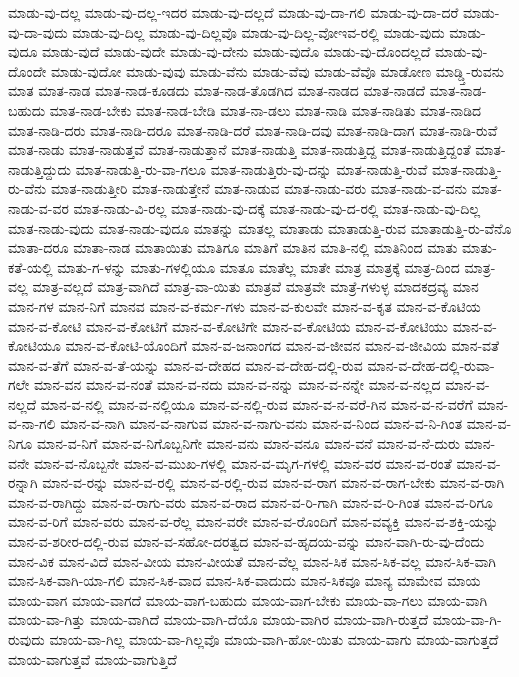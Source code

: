 {ಮಾಡು-ವು-ದಲ್ಲ
ಮಾಡು-ವು-ದಲ್ಲ-ಇದರ
ಮಾಡು-ವು-ದಲ್ಲದೆ
ಮಾಡು-ವು-ದಾ-ಗಲಿ
ಮಾಡು-ವು-ದಾ-ದರೆ
ಮಾಡು-ವು-ದಾ-ವುದು
ಮಾಡು-ವು-ದಿಲ್ಲ
ಮಾಡು-ವು-ದಿಲ್ಲವೊ
ಮಾಡು-ವು-ದಿಲ್ಲ-ವೋಇವ-ರಲ್ಲಿ
ಮಾಡು-ವುದು
ಮಾಡು-ವುದೂ
ಮಾಡು-ವುದೆ
ಮಾಡು-ವುದೇ
ಮಾಡು-ವು-ದೇನು
ಮಾಡು-ವುದೊ
ಮಾಡು-ವು-ದೊಂದಲ್ಲದೆ
ಮಾಡು-ವು-ದೊಂದೇ
ಮಾಡು-ವುದೋ
ಮಾಡು-ವುವು
ಮಾಡು-ವೆನು
ಮಾಡು-ವೆವು
ಮಾಡು-ವೆವೊ
ಮಾಡೋಣ
ಮಾಡ್ಡ್ತಿ-ರುವನು
ಮಾತ
ಮಾತ-ನಾಡ
ಮಾತ-ನಾಡ-ಕೂಡದು
ಮಾತ-ನಾಡ-ತೊಡಗಿದ
ಮಾತ-ನಾಡದ
ಮಾತ-ನಾಡದೆ
ಮಾತ-ನಾಡ-ಬಹುದು
ಮಾತ-ನಾಡ-ಬೇಕು
ಮಾತ-ನಾಡ-ಬೇಡಿ
ಮಾತ-ನಾ-ಡಲು
ಮಾತ-ನಾಡಿ
ಮಾತ-ನಾಡಿತು
ಮಾತ-ನಾಡಿದ
ಮಾತ-ನಾಡಿ-ದರು
ಮಾತ-ನಾಡಿ-ದರೂ
ಮಾತ-ನಾಡಿ-ದರೆ
ಮಾತ-ನಾಡಿ-ದವು
ಮಾತ-ನಾಡಿ-ದಾಗ
ಮಾತ-ನಾಡಿ-ರುವೆ
ಮಾತ-ನಾಡು
ಮಾತ-ನಾಡುತ್ತವೆ
ಮಾತ-ನಾಡುತ್ತಾನೆ
ಮಾತ-ನಾಡುತ್ತಿ
ಮಾತ-ನಾಡುತ್ತಿದ್ದ
ಮಾತ-ನಾಡುತ್ತಿದ್ದಂತೆ
ಮಾತ-ನಾಡುತ್ತಿದ್ದುದು
ಮಾತ-ನಾಡುತ್ತಿ-ರು-ವಾ-ಗಲೂ
ಮಾತ-ನಾಡುತ್ತಿರು-ವು-ದನ್ನು
ಮಾತ-ನಾಡುತ್ತಿ-ರುವೆ
ಮಾತ-ನಾಡುತ್ತಿ-ರು-ವೆನು
ಮಾತ-ನಾಡುತ್ತೀರಿ
ಮಾತ-ನಾಡುತ್ತೇನೆ
ಮಾತ-ನಾಡುವ
ಮಾತ-ನಾಡು-ವರು
ಮಾತ-ನಾಡು-ವ-ವನು
ಮಾತ-ನಾಡು-ವ-ವರ
ಮಾತ-ನಾಡು-ವಿ-ರಲ್ಲ
ಮಾತ-ನಾಡು-ವು-ದಕ್ಕೆ
ಮಾತ-ನಾಡು-ವು-ದ-ರಲ್ಲಿ
ಮಾತ-ನಾಡು-ವು-ದಿಲ್ಲ
ಮಾತ-ನಾಡು-ವುದು
ಮಾತ-ನಾಡು-ವುದೂ
ಮಾತನ್ನು
ಮಾತಲ್ಲ
ಮಾತಾಡು
ಮಾತಾಡುತ್ತಿ-ರುವ
ಮಾತಾಡುತ್ತಿ-ರು-ವೆನೊ
ಮಾತಾ-ದರೂ
ಮಾತಾ-ನಾಡ
ಮಾತಾಯಿತು
ಮಾತಿಗೂ
ಮಾತಿಗೆ
ಮಾತಿನ
ಮಾತಿ-ನಲ್ಲಿ
ಮಾತಿನಿಂದ
ಮಾತು
ಮಾತು-ಕತೆ-ಯಲ್ಲಿ
ಮಾತು-ಗ-ಳನ್ನು
ಮಾತು-ಗಳಲ್ಲಿಯೂ
ಮಾತೂ
ಮಾತೆಲ್ಲ
ಮಾತೇ
ಮಾತ್ರ
ಮಾತ್ರಕ್ಕೆ
ಮಾತ್ರ-ದಿಂದ
ಮಾತ್ರ-ವಲ್ಲ
ಮಾತ್ರ-ವಲ್ಲದೆ
ಮಾತ್ರ-ವಾಗಿದೆ
ಮಾತ್ರ-ವಾ-ಯಿತು
ಮಾತ್ರವೆ
ಮಾತ್ರವೇ
ಮಾತ್ರೆ-ಗಳುಳ್ಳ
ಮಾದಕದ್ರವ್ಯ
ಮಾನ
ಮಾನ-ಗಳ
ಮಾನ-ನಿಗೆ
ಮಾನವ
ಮಾನ-ವ-ಕರ್ಮ-ಗಳು
ಮಾನ-ವ-ಕುಲವೇ
ಮಾನ-ವ-ಕೃತ
ಮಾನ-ವ-ಕೊಟಿಯ
ಮಾನ-ವ-ಕೋಟಿ
ಮಾನ-ವ-ಕೋಟಿಗೆ
ಮಾನ-ವ-ಕೋಟಿಗೇ
ಮಾನ-ವ-ಕೋಟಿಯ
ಮಾನ-ವ-ಕೋಟಿಯು
ಮಾನ-ವ-ಕೋಟಿಯೂ
ಮಾನ-ವ-ಕೋಟಿ-ಯೊಂದಿಗೆ
ಮಾನ-ವ-ಜನಾಂಗದ
ಮಾನ-ವ-ಜೀವನ
ಮಾನ-ವ-ಜೀವಿಯ
ಮಾನ-ವತೆ
ಮಾನ-ವ-ತೆಗೆ
ಮಾನ-ವ-ತೆ-ಯನ್ನು
ಮಾನ-ವ-ದೇಹದ
ಮಾನ-ವ-ದೇಹ-ದಲ್ಲಿ-ರುವ
ಮಾನ-ವ-ದೇಹ-ದಲ್ಲಿ-ರುವಾ-ಗಲೇ
ಮಾನ-ವನ
ಮಾನ-ವ-ನಂತೆ
ಮಾನ-ವ-ನದು
ಮಾನ-ವ-ನನ್ನು
ಮಾನ-ವ-ನನ್ನೇ
ಮಾನ-ವ-ನಲ್ಲದ
ಮಾನ-ವ-ನಲ್ಲದೆ
ಮಾನ-ವ-ನಲ್ಲಿ
ಮಾನ-ವ-ನಲ್ಲಿಯೂ
ಮಾನ-ವ-ನಲ್ಲಿ-ರುವ
ಮಾನ-ವ-ನ-ವರೆ-ಗಿನ
ಮಾನ-ವ-ನ-ವರೆಗೆ
ಮಾನ-ವ-ನಾ-ಗಲಿ
ಮಾನ-ವ-ನಾಗಿ
ಮಾನ-ವ-ನಾಗುವ
ಮಾನ-ವ-ನಾಗು-ವನು
ಮಾನ-ವ-ನಿಂದ
ಮಾನ-ವ-ನಿ-ಗಿಂತ
ಮಾನ-ವ-ನಿಗೂ
ಮಾನ-ವ-ನಿಗೆ
ಮಾನ-ವ-ನಿಗೊಬ್ಬನಿಗೇ
ಮಾನ-ವನು
ಮಾನ-ವನೂ
ಮಾನ-ವನೆ
ಮಾನ-ವ-ನೆ-ದುರು
ಮಾನ-ವನೇ
ಮಾನ-ವ-ನೊಬ್ಬನೇ
ಮಾನ-ವ-ಮುಖ-ಗಳಲ್ಲಿ
ಮಾನ-ವ-ಮೃಗ-ಗಳಲ್ಲಿ
ಮಾನ-ವರ
ಮಾನ-ವ-ರಂತೆ
ಮಾನ-ವ-ರನ್ನಾಗಿ
ಮಾನ-ವ-ರನ್ನು
ಮಾನ-ವ-ರಲ್ಲಿ
ಮಾನ-ವ-ರಲ್ಲಿ-ರುವ
ಮಾನ-ವ-ರಾಗ
ಮಾನ-ವ-ರಾಗ-ಬೇಕು
ಮಾನ-ವ-ರಾಗಿ
ಮಾನ-ವ-ರಾಗಿದ್ದು
ಮಾನ-ವ-ರಾಗು-ವರು
ಮಾನ-ವ-ರಾದ
ಮಾನ-ವ-ರಿ-ಗಾಗಿ
ಮಾನ-ವ-ರಿ-ಗಿಂತ
ಮಾನ-ವ-ರಿಗೂ
ಮಾನ-ವ-ರಿಗೆ
ಮಾನ-ವರು
ಮಾನ-ವ-ರೆಲ್ಲ
ಮಾನ-ವರೇ
ಮಾನ-ವ-ರೊಂದಿಗೆ
ಮಾನ-ವವ್ಯಕ್ತಿ
ಮಾನ-ವ-ಶಕ್ತಿ-ಯನ್ನು
ಮಾನ-ವ-ಶರೀರ-ದಲ್ಲಿ-ರುವ
ಮಾನ-ವ-ಸಹೋ-ದರತ್ವದ
ಮಾನ-ವ-ಹೃದಯ-ವನ್ನು
ಮಾನ-ವಾಗಿ-ರು-ವು-ದೆಂದು
ಮಾನ-ವಿಕ
ಮಾನ-ವಿದೆ
ಮಾನ-ವೀಯ
ಮಾನ-ವೀಯತೆ
ಮಾನ-ವೆಲ್ಲ
ಮಾನ-ಸಿಕ
ಮಾನ-ಸಿಕ-ವಲ್ಲ
ಮಾನ-ಸಿಕ-ವಾಗಿ
ಮಾನ-ಸಿಕ-ವಾಗಿ-ಯಾ-ಗಲಿ
ಮಾನ-ಸಿಕ-ವಾದ
ಮಾನ-ಸಿಕ-ವಾದುದು
ಮಾನ-ಸಿಕವೂ
ಮಾನ್ಯ
ಮಾಮೇವ
ಮಾಯ
ಮಾಯ-ವಾಗ
ಮಾಯ-ವಾಗದೆ
ಮಾಯ-ವಾಗ-ಬಹುದು
ಮಾಯ-ವಾಗ-ಬೇಕು
ಮಾಯ-ವಾ-ಗಲು
ಮಾಯ-ವಾಗಿ
ಮಾಯ-ವಾ-ಗಿತ್ತು
ಮಾಯ-ವಾಗಿದೆ
ಮಾಯ-ವಾಗಿ-ದೆಯೊ
ಮಾಯ-ವಾಗಿರ
ಮಾಯ-ವಾಗಿ-ರುತ್ತದೆ
ಮಾಯ-ವಾ-ಗಿ-ರುವುದು
ಮಾಯ-ವಾ-ಗಿಲ್ಲ
ಮಾಯ-ವಾ-ಗಿಲ್ಲವೊ
ಮಾಯ-ವಾಗಿ-ಹೋ-ಯಿತು
ಮಾಯ-ವಾಗು
ಮಾಯ-ವಾಗುತ್ತದೆ
ಮಾಯ-ವಾಗುತ್ತವೆ
ಮಾಯ-ವಾಗುತ್ತಿದೆ
}
